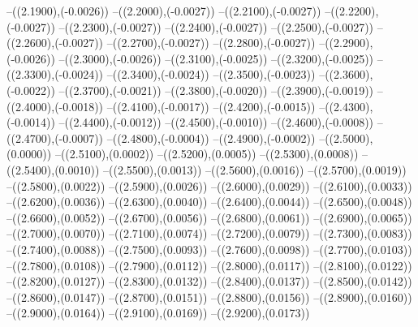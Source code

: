 {	--({\sx*(2.1900)},{\sy*(-0.0026)})
	--({\sx*(2.2000)},{\sy*(-0.0027)})
	--({\sx*(2.2100)},{\sy*(-0.0027)})
	--({\sx*(2.2200)},{\sy*(-0.0027)})
	--({\sx*(2.2300)},{\sy*(-0.0027)})
	--({\sx*(2.2400)},{\sy*(-0.0027)})
	--({\sx*(2.2500)},{\sy*(-0.0027)})
	--({\sx*(2.2600)},{\sy*(-0.0027)})
	--({\sx*(2.2700)},{\sy*(-0.0027)})
	--({\sx*(2.2800)},{\sy*(-0.0027)})
	--({\sx*(2.2900)},{\sy*(-0.0026)})
	--({\sx*(2.3000)},{\sy*(-0.0026)})
	--({\sx*(2.3100)},{\sy*(-0.0025)})
	--({\sx*(2.3200)},{\sy*(-0.0025)})
	--({\sx*(2.3300)},{\sy*(-0.0024)})
	--({\sx*(2.3400)},{\sy*(-0.0024)})
	--({\sx*(2.3500)},{\sy*(-0.0023)})
	--({\sx*(2.3600)},{\sy*(-0.0022)})
	--({\sx*(2.3700)},{\sy*(-0.0021)})
	--({\sx*(2.3800)},{\sy*(-0.0020)})
	--({\sx*(2.3900)},{\sy*(-0.0019)})
	--({\sx*(2.4000)},{\sy*(-0.0018)})
	--({\sx*(2.4100)},{\sy*(-0.0017)})
	--({\sx*(2.4200)},{\sy*(-0.0015)})
	--({\sx*(2.4300)},{\sy*(-0.0014)})
	--({\sx*(2.4400)},{\sy*(-0.0012)})
	--({\sx*(2.4500)},{\sy*(-0.0010)})
	--({\sx*(2.4600)},{\sy*(-0.0008)})
	--({\sx*(2.4700)},{\sy*(-0.0007)})
	--({\sx*(2.4800)},{\sy*(-0.0004)})
	--({\sx*(2.4900)},{\sy*(-0.0002)})
	--({\sx*(2.5000)},{\sy*(0.0000)})
	--({\sx*(2.5100)},{\sy*(0.0002)})
	--({\sx*(2.5200)},{\sy*(0.0005)})
	--({\sx*(2.5300)},{\sy*(0.0008)})
	--({\sx*(2.5400)},{\sy*(0.0010)})
	--({\sx*(2.5500)},{\sy*(0.0013)})
	--({\sx*(2.5600)},{\sy*(0.0016)})
	--({\sx*(2.5700)},{\sy*(0.0019)})
	--({\sx*(2.5800)},{\sy*(0.0022)})
	--({\sx*(2.5900)},{\sy*(0.0026)})
	--({\sx*(2.6000)},{\sy*(0.0029)})
	--({\sx*(2.6100)},{\sy*(0.0033)})
	--({\sx*(2.6200)},{\sy*(0.0036)})
	--({\sx*(2.6300)},{\sy*(0.0040)})
	--({\sx*(2.6400)},{\sy*(0.0044)})
	--({\sx*(2.6500)},{\sy*(0.0048)})
	--({\sx*(2.6600)},{\sy*(0.0052)})
	--({\sx*(2.6700)},{\sy*(0.0056)})
	--({\sx*(2.6800)},{\sy*(0.0061)})
	--({\sx*(2.6900)},{\sy*(0.0065)})
	--({\sx*(2.7000)},{\sy*(0.0070)})
	--({\sx*(2.7100)},{\sy*(0.0074)})
	--({\sx*(2.7200)},{\sy*(0.0079)})
	--({\sx*(2.7300)},{\sy*(0.0083)})
	--({\sx*(2.7400)},{\sy*(0.0088)})
	--({\sx*(2.7500)},{\sy*(0.0093)})
	--({\sx*(2.7600)},{\sy*(0.0098)})
	--({\sx*(2.7700)},{\sy*(0.0103)})
	--({\sx*(2.7800)},{\sy*(0.0108)})
	--({\sx*(2.7900)},{\sy*(0.0112)})
	--({\sx*(2.8000)},{\sy*(0.0117)})
	--({\sx*(2.8100)},{\sy*(0.0122)})
	--({\sx*(2.8200)},{\sy*(0.0127)})
	--({\sx*(2.8300)},{\sy*(0.0132)})
	--({\sx*(2.8400)},{\sy*(0.0137)})
	--({\sx*(2.8500)},{\sy*(0.0142)})
	--({\sx*(2.8600)},{\sy*(0.0147)})
	--({\sx*(2.8700)},{\sy*(0.0151)})
	--({\sx*(2.8800)},{\sy*(0.0156)})
	--({\sx*(2.8900)},{\sy*(0.0160)})
	--({\sx*(2.9000)},{\sy*(0.0164)})
	--({\sx*(2.9100)},{\sy*(0.0169)})
	--({\sx*(2.9200)},{\sy*(0.0173)})
}

